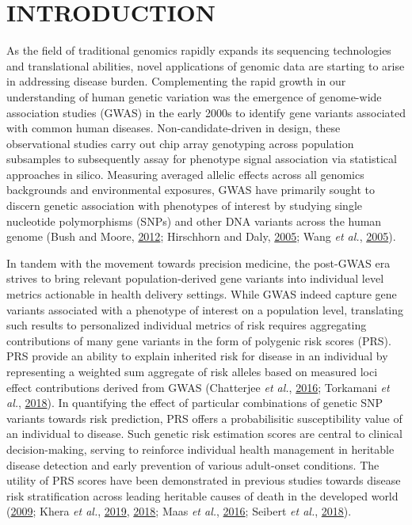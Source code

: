 \documentclass[a4paper,twoside, 9pt]{article}
\begin{document}
\section{\uppercase{Introduction}}
\label{sec:introduction}

\noindent As the field of traditional genomics rapidly expands its sequencing
technologies and translational abilities, novel applications of genomic
data are starting to arise in addressing disease burden. Complementing
the rapid growth in our understanding of human genetic variation was the
emergence of genome-wide association studies (GWAS) in the early 2000s
to identify gene variants associated with common human diseases.
Non-candidate-driven in design, these observational studies carry out
chip array genotyping across population subsamples to subsequently assay
for phenotype signal association via statistical approaches in silico.
Measuring averaged allelic effects across all genomics backgrounds and
environmental exposures, GWAS have primarily sought to discern genetic
association with phenotypes of interest by studying single nucleotide
polymorphisms (SNPs) and other DNA variants across the human genome
(Bush and Moore, \protect\hyperlink{ref-iFUfVw9V}{2012}; Hirschhorn and
Daly, \protect\hyperlink{ref-5cdeEdUS}{2005}; Wang \emph{et al.},
\protect\hyperlink{ref-12kQ0EOWQ}{2005}).

In tandem with the movement towards precision medicine, the post-GWAS
era strives to bring relevant population-derived gene variants into
individual level metrics actionable in health delivery settings. While
GWAS indeed capture gene variants associated with a phenotype of
interest on a population level, translating such results to personalized
individual metrics of risk requires aggregating contributions of many
gene variants in the form of polygenic risk scores (PRS). PRS provide an
ability to explain inherited risk for disease in an individual by
representing a weighted sum aggregate of risk alleles based on measured
loci effect contributions derived from GWAS (Chatterjee \emph{et al.},
\protect\hyperlink{ref-auyRflEe}{2016}; Torkamani \emph{et al.},
\protect\hyperlink{ref-1GK3F1BxE}{2018}). In quantifying the effect of
particular combinations of genetic SNP variants towards risk prediction,
PRS offers a probabilisitic susceptibility value of an individual to
disease. Such genetic risk estimation scores are central to clinical
decision-making, serving to reinforce individual health management in
heritable disease detection and early prevention of various adult-onset
conditions. The utility of PRS scores have been demonstrated in previous
studies towards disease risk stratification across leading heritable
causes of death in the developed world
(\protect\hyperlink{ref-mwTa2RUK}{2009}; Khera \emph{et al.},
\protect\hyperlink{ref-oBD9eYkN}{2019},
\protect\hyperlink{ref-Gh0gKn77}{2018}; Maas \emph{et al.},
\protect\hyperlink{ref-Z12fynub}{2016}; Seibert \emph{et al.},
\protect\hyperlink{ref-gkABDVTx}{2018}).
\end{document}
